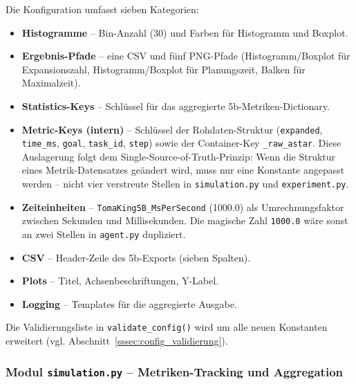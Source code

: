 

Die Konfiguration umfasst sieben Kategorien:

\begin{itemize}
    \item \textbf{Histogramme} -- Bin-Anzahl (30) und Farben für Histogramm und Boxplot.
    \item \textbf{Ergebnis-Pfade} -- eine CSV und fünf PNG-Pfade (Histogramm/Boxplot für Expansionszahl, Histogramm/Boxplot für Planungszeit, Balken für Maximalzeit).
    \item \textbf{Statistics-Keys} -- Schlüssel für das aggregierte 5b-Metriken-Dictionary.
    \item \textbf{Metric-Keys (intern)} -- Schlüssel der Rohdaten-Struktur (\texttt{expanded}, \texttt{time\_ms}, \texttt{goal}, \texttt{task\_id}, \texttt{step}) sowie der Container-Key \texttt{\_raw\_astar}. Diese Auslagerung folgt dem Single-Source-of-Truth-Prinzip: Wenn die Struktur eines Metrik-Datensatzes geändert wird, muss nur eine Konstante angepasst werden -- nicht vier verstreute Stellen in \texttt{simulation.py} und \texttt{experiment.py}.
    \item \textbf{Zeiteinheiten} -- \texttt{TomaKing5B\_MsPerSecond} (1000.0) als Umrechnungsfaktor zwischen Sekunden und Millisekunden. Die magische Zahl \texttt{1000.0} wäre sonst an zwei Stellen in \texttt{agent.py} dupliziert.
    \item \textbf{CSV} -- Header-Zeile des 5b-Exports (sieben Spalten).
    \item \textbf{Plots} -- Titel, Achsenbeschriftungen, Y-Label.
    \item \textbf{Logging} -- Templates für die aggregierte Ausgabe.
\end{itemize}

Die Validierungsliste in \texttt{validate\_config()} wird um alle neuen Konstanten erweitert (vgl. Abschnitt~\ref{sssec:config_validierung}).


\subsubsection{Modul \texttt{simulation.py} – Metriken-Tracking und Aggregation}

